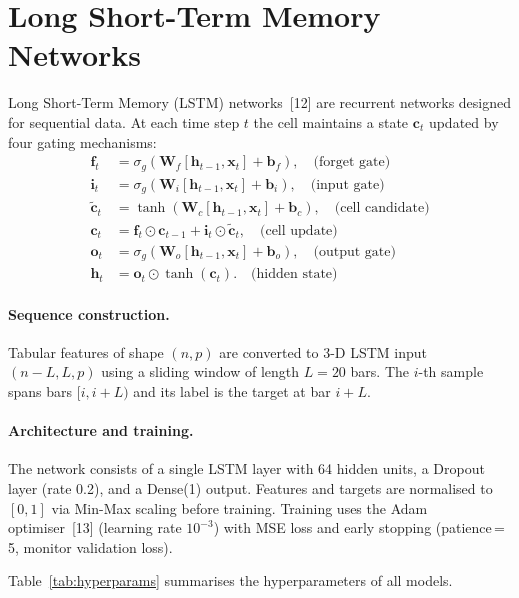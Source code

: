 \documentclass[12pt, a4paper, oneside]{report}
\theoremstyle{plain}
\theoremstyle{definition}
\theoremstyle{remark}
\begin{document}
\section{Long Short-Term Memory Networks}
\label{sec:lstm}

Long Short-Term Memory (LSTM) networks~[12] are recurrent networks designed
for sequential data.  At each time step $t$ the cell maintains a state
$\mathbf{c}_t$ updated by four gating mechanisms:
\begin{align}
  \mathbf{f}_t &= \sigma_g(\mathbf{W}_f[\mathbf{h}_{t-1}, \mathbf{x}_t] + \mathbf{b}_f),
    \quad \text{(forget gate)} \\
  \mathbf{i}_t &= \sigma_g(\mathbf{W}_i[\mathbf{h}_{t-1}, \mathbf{x}_t] + \mathbf{b}_i),
    \quad \text{(input gate)} \\
  \tilde{\mathbf{c}}_t &= \tanh(\mathbf{W}_c[\mathbf{h}_{t-1}, \mathbf{x}_t] + \mathbf{b}_c),
    \quad \text{(cell candidate)} \\
  \mathbf{c}_t &= \mathbf{f}_t \odot \mathbf{c}_{t-1} + \mathbf{i}_t \odot \tilde{\mathbf{c}}_t,
    \quad \text{(cell update)} \\
  \mathbf{o}_t &= \sigma_g(\mathbf{W}_o[\mathbf{h}_{t-1}, \mathbf{x}_t] + \mathbf{b}_o),
    \quad \text{(output gate)} \\
  \mathbf{h}_t &= \mathbf{o}_t \odot \tanh(\mathbf{c}_t).
    \quad \text{(hidden state)}
\end{align}

\paragraph{Sequence construction.}
Tabular features of shape $(n, p)$ are converted to 3-D LSTM input
$(n - L, L, p)$ using a sliding window of length $L = 20$ bars.  The
$i$-th sample spans bars $[i, i+L)$ and its label is the target at bar $i+L$.

\paragraph{Architecture and training.}
The network consists of a single LSTM layer with 64 hidden units, a Dropout
layer (rate 0.2), and a Dense(1) output.  Features and targets are normalised
to $[0,1]$ via Min-Max scaling before training.  Training uses the Adam
optimiser~[13] (learning rate $10^{-3}$) with MSE loss and early stopping
(patience\,=\,5, monitor validation loss).

Table~\ref{tab:hyperparams} summarises the hyperparameters of all models.
\end{document}
